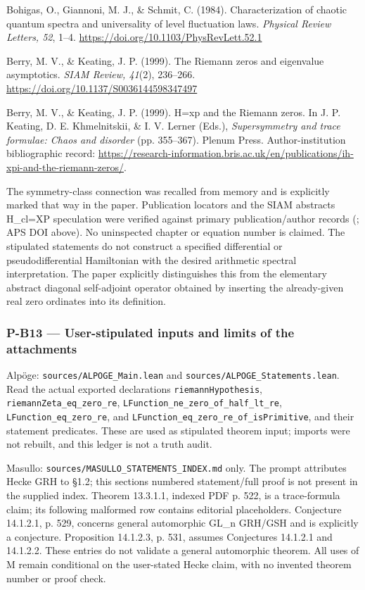 \documentclass[11pt,a4paper]{article}
\theoremstyle{definition}\newtheorem{definition}{Definition}
\begin{document}
Bohigas, O., Giannoni, M. J., \& Schmit, C. (1984). Characterization of
chaotic quantum spectra and universality of level fluctuation laws.
\emph{Physical Review Letters, 52}, 1--4.
\url{https://doi.org/10.1103/PhysRevLett.52.1}

Berry, M. V., \& Keating, J. P. (1999). The Riemann zeros and eigenvalue
asymptotics. \emph{SIAM Review, 41}(2), 236--266.
\url{https://doi.org/10.1137/S0036144598347497}

Berry, M. V., \& Keating, J. P. (1999). H=xp and the Riemann zeros. In
J. P. Keating, D. E. Khmelnitskii, \& I. V. Lerner (Eds.),
\emph{Supersymmetry and trace formulae: Chaos and disorder} (pp.
355--367). Plenum Press. Author-institution bibliographic record:
\url{https://research-information.bris.ac.uk/en/publications/ih-xpi-and-the-riemann-zeros/}.

The symmetry-class connection was recalled from memory and is explicitly
marked that way in the paper. Publication locators and the SIAM
abstract\textquotesingle s H\_cl=XP speculation were verified against
primary publication/author records (; APS DOI above). No uninspected
chapter or equation number is claimed. The stipulated statements do not
construct a specified differential or pseudodifferential Hamiltonian
with the desired arithmetic spectral interpretation. The paper
explicitly distinguishes this from the elementary abstract diagonal
self-adjoint operator obtained by inserting the already-given real zero
ordinates into its definition.

\subsubsection{P-B13 --- User-stipulated inputs and limits of the
attachments}\label{p-b13--user-stipulated-inputs-and-limits-of-the-attachments}

Alpöge: \nolinkurl{sources/ALPOGE_Main.lean} and
\nolinkurl{sources/ALPOGE_Statements.lean}. Read the actual exported
declarations \nolinkurl{riemannHypothesis},
\nolinkurl{riemannZeta_eq_zero_re},
\nolinkurl{LFunction_ne_zero_of_half_lt_re},
\nolinkurl{LFunction_eq_zero_re}, and
\nolinkurl{LFunction_eq_zero_re_of_isPrimitive}, and their statement
predicates. These are used as stipulated theorem input; imports were not
rebuilt, and this ledger is not a truth audit.

Masullo: \nolinkurl{sources/MASULLO_STATEMENTS_INDEX.md} only. The prompt
attributes Hecke GRH to §1.2; this section\textquotesingle s numbered
statement/full proof is not present in the supplied index. Theorem
13.3.1.1, indexed PDF p. 522, is a trace-formula claim; its following
malformed row contains editorial placeholders. Conjecture 14.1.2.1, p.
529, concerns general automorphic GL\_n GRH/GSH and is explicitly a
conjecture. Proposition 14.1.2.3, p. 531, assumes Conjectures 14.1.2.1
and 14.1.2.2. These entries do not validate a general automorphic
theorem. All uses of M remain conditional on the user-stated Hecke
claim, with no invented theorem number or proof check.
\end{document}
